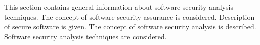 %
%
This section contains general information about software security analysis techniques. 
%
The concept of software security assurance is considered. 
%
Description of secure software is given. 
%
The concept of software security analysis is described. 
%
Software security analysis techniques are considered. 